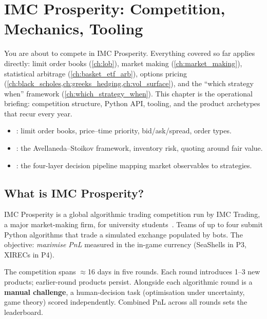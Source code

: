 \chapter{IMC Prosperity: Competition, Mechanics, Tooling}
\label{ch:prosperity_setup}

You are about to compete in IMC Prosperity.  Everything covered so far
applies directly: limit
order books (\cref{ch:lob}), market making (\cref{ch:market_making}),
statistical arbitrage (\cref{ch:basket_etf_arb}), options pricing
(\cref{ch:black_scholes,ch:greeks_hedging,ch:vol_surface}), and the
``which strategy when'' framework (\cref{ch:which_strategy_when}).  This chapter is the operational briefing: competition
structure, Python API, tooling, and the product archetypes that recur
every year.

\begin{backgroundbox}[Prerequisites]
\begin{itemize}
  \item {}: limit order books, price--time priority,
  bid/ask/spread, order types.
  \item {}: the Avellaneda--Stoikov framework,
  inventory risk, quoting around fair value.
  \item {}: the four-layer decision
  pipeline mapping market observables to strategies.
\end{itemize}
\end{backgroundbox}

\section{What is IMC Prosperity?}
\label{sec:prosperity_what}

IMC Prosperity is a global algorithmic trading competition run by IMC
Trading, a major market-making firm, for university
students~\citep{prosperity4wiki}.  Teams of up to four submit Python
algorithms that trade a simulated exchange populated by bots.  The
objective: \emph{maximise PnL} measured in the in-game currency
(SeaShells in P3, XIRECs in P4).

The competition spans $\approx$16 days in five rounds.  Each round
introduces 1--3 new products; earlier-round products persist.  Alongside
each algorithmic round is a \textbf{manual challenge}, a human-decision
task (optimisation under uncertainty, game theory) scored independently.
Combined PnL across all rounds sets the leaderboard.

